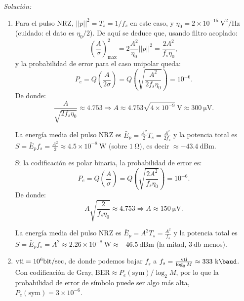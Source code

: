 \documentclass[a4paper,11pt]{article}
\newenvironment{solucion}[1][]{
\noindent \large \textsl{Solución:} \ifthenelse{\equal{#1}{}}{}{\emph{(#1)}}

\smallskip
}{
\bigskip
}
\begin{document}
\begin{solucion}
\begin{enumerate}
        \item Para el pulso NRZ, $||p||^2 = T_s = 1/f_s$ en este caso, y $\eta_0=2\times10^{-15}\ \unit{\square\volt/\hertz}$ (cuidado: el dato es $\eta_0/2$). De aquí se deduce que, usando filtro acoplado:
        \begin{equation*}
                \left(\frac{A}{\sigma}\right)^2_{\max} = 2 \frac{A^2}{\eta_0} ||p||^2 = \frac{2A^2}{f_s \eta_0},
        \end{equation*}
        y la probabilidad de error para el caso unipolar queda:
        \begin{equation*}
                P_e = Q\left(\frac{A}{2\sigma}\right)=Q\left(\sqrt{\frac{A^2}{2f_s \eta_0}}\right) = 10^{-6}.
        \end{equation*}
        De donde:
        \begin{equation*}
        \frac{A}{\sqrt{2f_s \eta_0}} \approx 4.753 \Rightarrow A \approx 4.753\sqrt{4\times10^{-9}}\ \unit{\volt}\approx 300\ \unit{\micro\volt}.
        \end{equation*}

        La energía media del pulso NRZ es $\bar{E}_p = \frac{A^2}{2}T_s = \frac{A^2}{2f_s}$ y la potencia total es $S = \bar{E}_p f_s = \frac{A^2}{2} \approx 4.5 \times 10^{-8}\ \unit{\watt}$ (sobre $1\ \unit{\ohm}$), es decir $\approx -43.4\ \mathrm{dBm}$.

        Si la codificación es polar binaria, la probabilidad de error es:
        \begin{equation*}
                P_e = Q\left(\frac{A}{\sigma}\right)=Q\left(\sqrt{\frac{2A^2}{f_s \eta_0}}\right) = 10^{-6}.
        \end{equation*}
        De donde:
        \begin{equation*}
        A\sqrt{\frac{2}{f_s \eta_0}} \approx 4.753 \Rightarrow A \approx 150\ \unit{\micro\volt}.
        \end{equation*}

        La energía media del pulso NRZ es $\bar{E}_p = A^2 T_s = \frac{A^2}{f_s}$ y la potencia total es $S = \bar{E}_p f_s = A^2 \approx 2.26 \times 10^{-8}\ \unit{\watt}\approx -46.5\ \mathrm{dBm}$ (la mitad, $3\ \unit{\decibel}$ menos).

        \item $\mathrm{vti} = 10^6 \unit{\bit/\sec}$, de donde podemos bajar $f_s$ a $f_s = \frac{\mathrm{vti}}{\log_2 M} \approx 333\ \unit{\kilo\baud}$. Con codificación de Gray, $\mathrm{BER}\approx P_e(\mathrm{sym})/\log_2 M$, por lo que la probabilidad de error de símbolo puede ser algo más alta, $P_e(\mathrm{sym}) = 3\times 10^{-6}$.


\end{enumerate}
\end{solucion}
\end{document}
